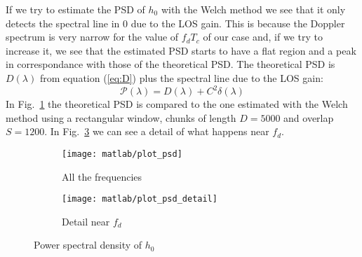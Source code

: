 \documentclass[a4paper,oneside]{article}
\begin{document}
If we try to estimate the PSD of $h_0$ with the Welch method we see
that it only detects the spectral line in 0 due to the LOS gain. This
is because the Doppler spectrum is very narrow for the value of
$f_dT_c$ of our case and, if we try to increase it, we see that the
estimated PSD starts to have a flat region and a peak in
correspondance with those of the theoretical PSD.  The theoretical PSD
is $D(\lambda)$ from equation (\ref{eq:D}) plus the spectral line due
to the LOS gain:
\begin{equation}
  \mathcal{P}(\lambda) = D(\lambda) + C^2\delta(\lambda)
\end{equation}
In Fig.~\ref{plot:psd} the theoretical PSD is compared to the one
estimated with the Welch method using a rectangular window, chunks of
length $D=5000$ and overlap $S=1200$. In Fig.~\ref{plot:psd_detail} we
can see a detail of what happens near $f_d$.
\begin{figure}[htbp]
  \centering
  \begin{subfigure}{0.7\textwidth}
    \centering
    \texttt{[image: matlab/plot\_psd]}
  \caption{All the frequencies}
  \label{plot:psd}
  \end{subfigure}
  \begin{subfigure}{0.7\textwidth}
    \centering
    \texttt{[image: matlab/plot\_psd\_detail]}
  \caption{Detail near $f_d$}
  \label{plot:psd_detail}
  \end{subfigure}
  \caption{Power spectral density of $h_0$}
\end{figure}
\end{document}
